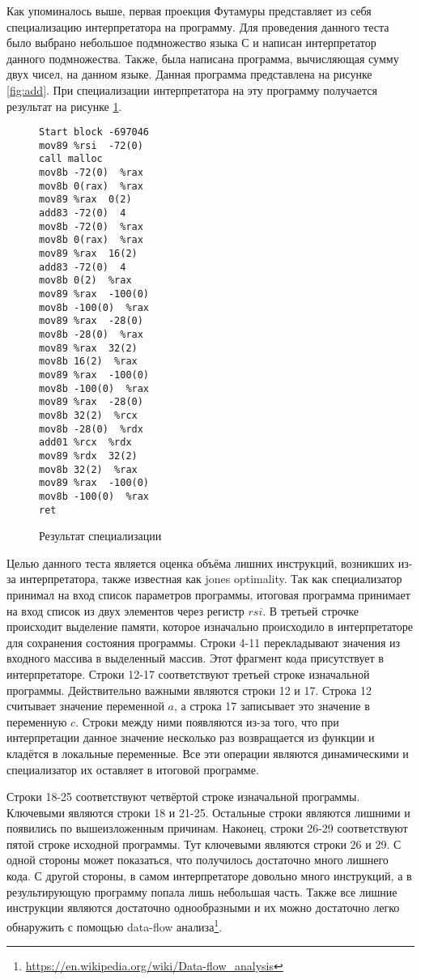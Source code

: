 \documentclass{spbau-diploma}
\begin{document}
Как упоминалось выше, первая проекция Футамуры представляет из себя специализацию интерпретатора на программу. Для проведения данного теста было выбрано небольшое подмножество языка С и написан интерпретатор данного подмножества. Также, была написана программа, вычисляющая сумму двух чисел, на данном языке. Данная программа представлена на рисунке \ref{fig:add}. При специализации интерпретатора на эту программу получается результат на рисунке \ref{fig:specadd}.

\begin{figure}[t]
\begin{multicols}{2}
\begin{lstlisting}
Start block -697046
mov89 %rsi  -72(0) 
call malloc
mov8b -72(0)  %rax
mov8b 0(rax)  %rax
mov89 %rax  0(2)
add83 -72(0)  4
mov8b -72(0)  %rax
mov8b 0(rax)  %rax
mov89 %rax  16(2)
add83 -72(0)  4
mov8b 0(2)  %rax 
mov89 %rax  -100(0) 
mov8b -100(0)  %rax 
mov89 %rax  -28(0) 
mov8b -28(0)  %rax 
mov89 %rax  32(2)
mov8b 16(2)  %rax 
mov89 %rax  -100(0) 
mov8b -100(0)  %rax 
mov89 %rax  -28(0) 
mov8b 32(2)  %rcx 
mov8b -28(0)  %rdx 
add01 %rcx  %rdx 
mov89 %rdx  32(2) 
mov8b 32(2)  %rax 
mov89 %rax  -100(0) 
mov8b -100(0)  %rax 
ret
\end{lstlisting}
\end{multicols}
\caption{ Результат специализации}
\label{fig:specadd}
\end{figure}

Целью данного теста является оценка объёма лишних инструкций, возникших из-за интерпретатора, также известная как jones optimality\cite{optimal}. Так как специализатор принимал на вход список параметров программы, итоговая программа принимает на вход список из двух элементов через регистр $rsi$. В третьей строчке происходит выделение памяти, которое изначально происходило в интерпретаторе для сохранения состояния программы. Строки 4-11 перекладывают значения из входного массива в выделенный массив. Этот фрагмент кода присутствует в интерпретаторе. Строки 12-17 соответствуют третьей строке изначальной программы. Действительно важными являются строки 12 и 17. Строка 12 считывает значение переменной $a$, а строка 17 записывает это значение в переменную $c$. Строки между ними появляются из-за того, что при интерпретации данное значение несколько раз возвращается из функции и кладётся в локальные переменные. Все эти операции являются динамическими и специализатор их оставляет в итоговой программе. 

Строки 18-25 соответствуют четвёртой строке изначальной программы. Ключевыми являются строки 18 и 21-25. Остальные строки являются лишними и появились по вышеизложенным причинам. Наконец, строки 26-29 соответствуют пятой строке исходной программы. Тут ключевыми являются строки 26 и 29. С одной стороны может показаться, что получилось достаточно много лишнего кода. С другой стороны, в самом интерпретаторе довольно много инструкций, а в результирующую программу попала лишь небольшая часть. Также все лишние инструкции являются достаточно однообразными и их можно достаточно легко обнаружить с помощью data-flow анализа\footnote{\url{https://en.wikipedia.org/wiki/Data-flow_analysis}}.
\end{document}
